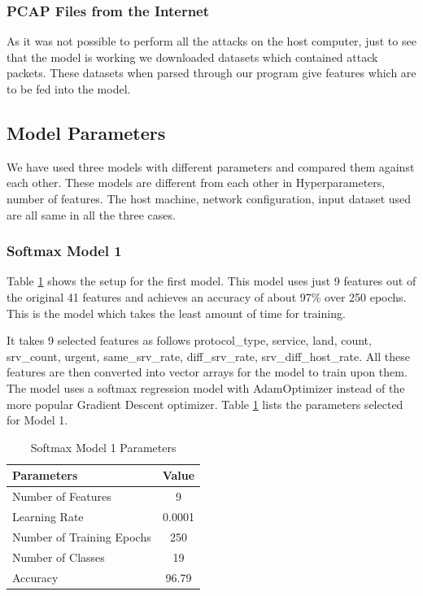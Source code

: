 \documentclass[12pt]{article}
\theoremstyle{definition}
\begin{document}
			\subsubsection{PCAP Files from the Internet}
			As it was not possible to perform all the attacks on the host computer, just to see that the model is working we downloaded datasets which contained attack packets. These datasets when parsed through our program give features which are to be fed into the model.
			
			
		\subsection{Model Parameters}
			We have used three models with different parameters and compared them against each other. These models are different from each other in Hyperparameters, number of features. The host machine, network configuration, input dataset used are all same in all the three cases.
			\subsubsection{Softmax Model 1}
			Table \ref{tab:model-1-params} shows the setup for the first model. This model uses just 9 features out of the original 41 features and achieves an accuracy of about 97\% over 250 epochs. This is the model which takes the least amount of time for training. 
			
			It takes 9 selected features as follows  protocol\_type, service, land, count, srv\_count, urgent, same\_srv\_rate, diff\_srv\_rate, srv\_diff\_host\_rate. All these features are then converted into vector arrays for the model to train upon them. The model uses a softmax regression model with AdamOptimizer instead of the more popular Gradient Descent optimizer. Table \ref{tab:model-1-params} lists the parameters selected for Model 1.
			
			\begin{table}[h!]
				\centering
				\caption{Softmax Model 1 Parameters}
				\label{tab:model-1-params}
				\begin{tabular}{|l|c|}
					\hline
					\bfseries{Parameters} & \textbf{Value} \\ \hline
					Number of Features & 9 \\
					Learning Rate & 0.0001 \\
					Number of Training Epochs & 250 \\
					Number of Classes & 19 \\ 
					Accuracy & 96.79 \\
					\hline	
				\end{tabular}
				
			\end{table}
		
\end{document}
